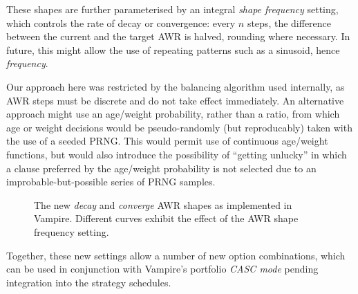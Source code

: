\documentclass{llncs}
\begin{document}
These shapes are further parameterised by an integral \emph{shape frequency} setting, which controls the rate of decay or convergence: every \(n\) steps, the difference between the current and the target AWR is halved, rounding where necessary.
In future, this might allow the use of repeating patterns such as a sinusoid, hence \emph{frequency}.

Our approach here was restricted by the balancing algorithm used internally, as AWR steps must be discrete and do not take effect immediately.
An alternative approach might use an age/weight probability, rather than a ratio, from which age or weight decisions would be pseudo-randomly (but reproducably) taken with the use of a seeded PRNG.
This would permit use of continuous age/weight functions, but would also introduce the possibility of ``getting unlucky'' in which a clause preferred by the age/weight probability is not selected due to an improbable-but-possible series of PRNG samples.

\begin{figure}
	\caption{The new \emph{decay} and \emph{converge} AWR shapes as implemented in Vampire. Different curves exhibit the effect of the AWR shape frequency setting.}
	\label{fig:decay-and-converge}
\end{figure}

Together, these new settings allow a number of new option combinations, which can be used in conjunction with Vampire's portfolio \emph{CASC mode} pending integration into the strategy schedules.
\end{document}
